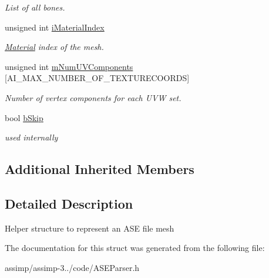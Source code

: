 \begin{DoxyCompactItemize}
\begin{DoxyCompactList}\small\item\em List of all bones. \end{DoxyCompactList}\item 
\hypertarget{struct_assimp_1_1_a_s_e_1_1_mesh_a393a3b0eebe1ebe471e28e9d5c990ee8}{unsigned int \hyperlink{struct_assimp_1_1_a_s_e_1_1_mesh_a393a3b0eebe1ebe471e28e9d5c990ee8}{i\+Material\+Index}}\label{struct_assimp_1_1_a_s_e_1_1_mesh_a393a3b0eebe1ebe471e28e9d5c990ee8}

\begin{DoxyCompactList}\small\item\em \hyperlink{struct_assimp_1_1_a_s_e_1_1_material}{Material} index of the mesh. \end{DoxyCompactList}\item 
\hypertarget{struct_assimp_1_1_a_s_e_1_1_mesh_aab9e9b10c06c5dda2422bc4ed274ef1e}{unsigned int \hyperlink{struct_assimp_1_1_a_s_e_1_1_mesh_aab9e9b10c06c5dda2422bc4ed274ef1e}{m\+Num\+U\+V\+Components} \mbox{[}A\+I\+\_\+\+M\+A\+X\+\_\+\+N\+U\+M\+B\+E\+R\+\_\+\+O\+F\+\_\+\+T\+E\+X\+T\+U\+R\+E\+C\+O\+O\+R\+D\+S\mbox{]}}\label{struct_assimp_1_1_a_s_e_1_1_mesh_aab9e9b10c06c5dda2422bc4ed274ef1e}

\begin{DoxyCompactList}\small\item\em Number of vertex components for each U\+V\+W set. \end{DoxyCompactList}\item 
\hypertarget{struct_assimp_1_1_a_s_e_1_1_mesh_ad2cb17dae697e1bea8a6dc815820d63f}{bool \hyperlink{struct_assimp_1_1_a_s_e_1_1_mesh_ad2cb17dae697e1bea8a6dc815820d63f}{b\+Skip}}\label{struct_assimp_1_1_a_s_e_1_1_mesh_ad2cb17dae697e1bea8a6dc815820d63f}

\begin{DoxyCompactList}\small\item\em used internally \end{DoxyCompactList}\end{DoxyCompactItemize}
\subsection*{Additional Inherited Members}


\subsection{Detailed Description}
Helper structure to represent an A\+S\+E file mesh 

The documentation for this struct was generated from the following file\+:\begin{DoxyCompactItemize}
\item 
assimp/assimp-\/3../code/A\+S\+E\+Parser.\+h\end{DoxyCompactItemize}
